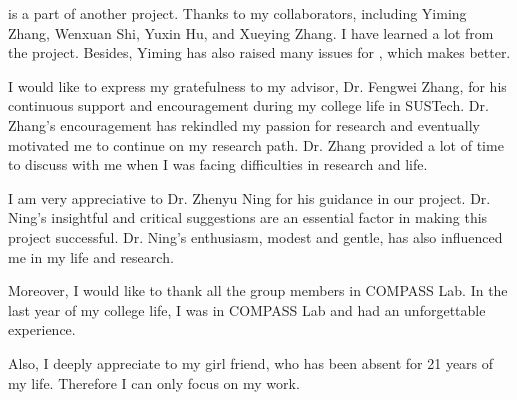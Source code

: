 \TheName is a part of another project. Thanks to my collaborators, including Yiming Zhang, Wenxuan Shi, Yuxin Hu, and Xueying Zhang. I have learned a lot from the project. Besides, Yiming has also raised many issues for \TheName, which makes \TheName better.

I would like to express my gratefulness to my advisor, Dr. Fengwei Zhang, for his continuous support and encouragement during my college life in SUSTech.  Dr. Zhang's encouragement has rekindled my passion for research and eventually motivated me to continue on my research path. Dr. Zhang provided a lot of time to discuss with me when I was facing difficulties in research and life.

I am very appreciative to Dr. Zhenyu Ning for his guidance in our project. Dr. Ning's insightful and critical suggestions are an essential factor in making this project successful. Dr. Ning's enthusiasm, modest and gentle, has also influenced me in my life and research.

Moreover, I would like to thank all the group members in COMPASS Lab. In the last year of my college life, I was in COMPASS Lab and had an unforgettable experience.

Also, I deeply appreciate to my girl friend, who has been absent for 21 years of my life. Therefore I can only focus on my work. 